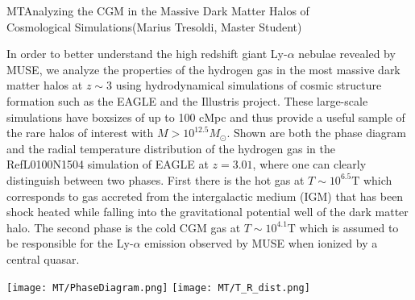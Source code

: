 \begin{section}{MT}{Analyzing the CGM in the Massive Dark Matter Halos of \\
    \hspace*{4cm} Cosmological Simulations}{(Marius Tresoldi, Master Student)}
  \begin{minipage}{0.52\linewidth}
{\small In order to better understand the high redshift giant
      Ly-$\alpha$ nebulae revealed by MUSE, we analyze the properties of the
      hydrogen gas in the most massive dark matter halos at $z \sim 3$ using
      hydrodynamical simulations of cosmic structure formation such as the EAGLE
      and the Illustris project. These large-scale simulations have boxsizes of
      up to 100 cMpc and thus provide a useful sample of the rare halos of
      interest with $M >10^12.5 M_{\odot}$. Shown are both the phase diagram and
      the radial
      temperature distribution of the hydrogen gas in the RefL0100N1504
      simulation of EAGLE at $z=3.01$, where one can clearly distinguish between
      two phases. First there is the hot gas at $T \sim 10^{6.5} \mathrm{T}$ which
      corresponds to gas accreted from the intergalactic medium (IGM) that has
      been shock heated while falling into the gravitational potential well of
      the dark matter halo. The second phase is the cold CGM gas at $T \sim
      10^4.1 \mathrm{T}$ which is assumed to be responsible for the Ly-$\alpha$
      emission observed by MUSE when ionized by a central quasar.}
  \end{minipage}
  \hfill
  \begin{minipage}{0.42\linewidth}
      \texttt{[image: MT/PhaseDiagram.png]}
      \texttt{[image: MT/T\_R\_dist.png]}
  \end{minipage}
\end{section}
